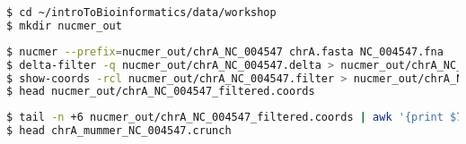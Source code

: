 \documentclass[a4paper]{article}
\begin{document}
\begin{lstlisting}[language=bash]
$ cd ~/introToBioinformatics/data/workshop
$ mkdir nucmer_out
\end{lstlisting}

\begin{lstlisting}[language=bash]
$ nucmer --prefix=nucmer_out/chrA_NC_004547 chrA.fasta NC_004547.fna
$ delta-filter -q nucmer_out/chrA_NC_004547.delta > nucmer_out/chrA_NC_004547.filter
$ show-coords -rcl nucmer_out/chrA_NC_004547.filter > nucmer_out/chrA_NC_004547_filtered.coords
$ head nucmer_out/chrA_NC_004547_filtered.coords
\end{lstlisting}

\begin{lstlisting}[language=bash]
$ tail -n +6 nucmer_out/chrA_NC_004547_filtered.coords | awk '{print $7" "$10" "$1" "$2" "$12" "$4" "$5" "$13}' > chrA_mummer_NC_004547.crunch
$ head chrA_mummer_NC_004547.crunch
\end{lstlisting}
\end{document}
